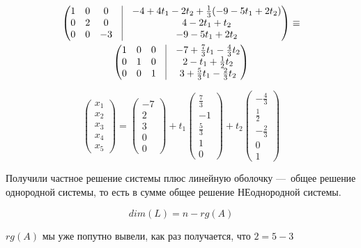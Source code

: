 \documentclass[12pt, a4paper]{article}
\begin{document}
\begin{multline}
\begin{pmatrix}
            1 & 0 & 0 & \vrule & - 4 + 4 t_1 - 2 t_2 + \frac13 (-9 - 5t_1 + 2t_2) \\
            0 & 2 & 0  & \vrule & 4 - 2t_1 + t_2 \\
            0 & 0 & -3 & \vrule & -9 - 5t_1 + 2t_2 \\
        \end{pmatrix} \equiv \\ \begin{pmatrix}
            1 & 0 & 0 & \vrule & -7 + \frac73 t_1 - \frac43 t_2 \\
            0 & 1 & 0  & \vrule & 2 - t_1 + \frac12 t_2 \\
            0 & 0 & 1 & \vrule & 3 + \frac53 t_1 - \frac23 t_2 \\
        \end{pmatrix}
    \end{multline}

    \begin{equation}
        \begin{pmatrix}
            x_1 \\ x_2 \\ x_3 \\ x_4 \\ x_5
        \end{pmatrix} = \begin{pmatrix}
            -7 \\ 2 \\ 3 \\ 0 \\ 0
        \end{pmatrix} + t_1 \begin{pmatrix}
            \frac73 \\ -1 \\ \frac53 \\ 1 \\ 0
        \end{pmatrix} + t_2 \begin{pmatrix}
            -\frac43 \\ \frac12 \\ -\frac23 \\ 0 \\ 1
        \end{pmatrix}
    \end{equation}

    Получили частное решение системы плюс линейную оболочку — общее решение однородной системы, 
    то есть в сумме общее решение НЕоднородной системы. 

    \begin{equation}
        dim(L) = n - rg(A)
    \end{equation}

    $rg(A)$ мы уже попутно вывели, как раз получается, что $2 = 5 - 3$
\end{document}
